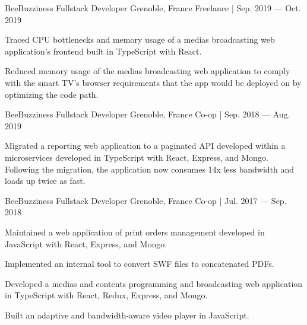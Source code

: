 

\begin{cventries}

    \cventry
    {BeeBuzziness} %
    {Fullstack Developer} %
    {Grenoble, France} %
    {Freelance | Sep. 2019 — Oct. 2019} %
    {
    \begin{cvitems} %
        \item {Traced CPU bottlenecks and memory usage of a medias broadcasting web application's frontend built in TypeScript with React.}
        \item {Reduced memory usage of the medias broadcasting web application to comply with the smart TV's browser requirements that the app would be deployed on by optimizing the code path.}
    \end{cvitems}
    }

    \cventry
    {BeeBuzziness} %
    {Fullstack Developer} %
    {Grenoble, France} %
    {Co-op | Sep. 2018 — Aug. 2019} %
    {
    \begin{cvitems} %
        \item {Migrated a reporting web application to a paginated API developed within a microservices developed in TypeScript with React, Express, and Mongo.
        Following the migration, the application now consumes 14x less bandwidth and loads up twice as fast.}
    \end{cvitems}
    }

    \cventry
    {BeeBuzziness} %
    {Fullstack Developer} %
    {Grenoble, France} %
    {Co-op | Jul. 2017 — Sep. 2018} %
    {
    \begin{cvitems} %
        \item {Maintained a web application of print orders management developed in JavaScript with React, Express, and Mongo.}
        \item {Implemented an internal tool to convert SWF files to concatenated PDFs.}
        \item {Developed a medias and contents programming and broadcasting web application in TypeScript with React, Redux, Express, and Mongo.}
        \item {Built an adaptive and bandwidth-aware video player in JavaScript.}
    \end{cvitems}
    }


\end{cventries}
